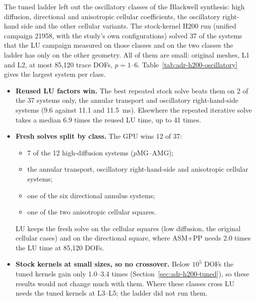 The tuned ladder left out the oscillatory classes of the Blackwell synthesis: high diffusion,
directional and anisotropic cellular coefficients, the oscillatory right-hand side and the other
cellular variants. The stock-kernel H200 run (unified campaign 21958, with the study's own
configurations) solved 37 of the systems that the LU campaign measured on those classes and on
the two classes the ladder has only on the other geometry. All of them are small: original
meshes, L1 and L2, at most 85{,}120 trace DOFs, $p=1$--6. Table~\ref{tab:adr-h200-oscillatory}
gives the largest system per class.
\begin{itemize}
\item \textbf{Reused LU factors win.} The best repeated stock solve beats them on 2 of the 37
  systems only, the annular transport and oscillatory right-hand-side systems (9.6 against 11.1
  and 11.5~ms). Elsewhere the repeated iterative solve takes a median 6.9 times the reused LU
  time, up to 41 times.
\item \textbf{Fresh solves split by class.} The GPU wins 12 of 37:
  \begin{itemize}
  \item 7 of the 12 high-diffusion systems ($p$MG--AMG);
  \item the annular transport, oscillatory right-hand-side and anisotropic cellular systems;
  \item one of the six directional annulus systems;
  \item one of the two anisotropic cellular squares.
  \end{itemize}
  LU keeps the fresh solve on the cellular squares (low diffusion, the original cellular cases)
  and on the directional square, where ASM+PP needs 2.0 times the LU time at 85{,}120 DOFs.
\item \textbf{Stock kernels at small sizes, so no crossover.} Below $10^5$ DOFs the tuned kernels
  gain only 1.0--3.4 times (Section~\ref{sec:adr-h200-tuned}), so these results would not change
  much with them. Where these classes cross LU needs the tuned kernels at L3--L5; the ladder did
  not run them.
\end{itemize}

\begin{table}[ht]
\centering\scriptsize
\resizebox{\linewidth}{!}{}
\caption{Classes outside the tuned ladder, stock kernels on the H200 against the genoa LU:
largest system per class with both (ms). Fresh: setup and first solve; repeated: second solve on
the same setup. Families: fastest fresh / fastest repeated.}
\label{tab:adr-h200-oscillatory}
\end{table}

